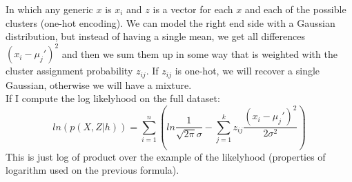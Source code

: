             In which any generic $x$ is $x_i$ and $z$ is a vector for each $x$ and each of the possible clusters (one-hot encoding). We can model the right end side with a Gaussian distribution, but instead of having a single mean, we get all differences $(x_i - \mu_j ') ^2$ and then we sum them up in some way that is weighted with the cluster assignment probability $z_{ij}$. 
            If $z_{ij}$ is one-hot, we will recover a single Gaussian, otherwise we will have a mixture. \\

            If I compute the log likelyhood on the full dataset: 
            $$ln(p(X, Z| h)) = 
            \sum _{i=1} ^n 
            \left(
            ln \frac{1}{\sqrt{2 \pi} \sigma}
                - \sum _{j=1} ^k z_{ij}
                    \frac{(x_i - \mu_j ' )^2}{2 \sigma ^ 2}
            \right)
            $$
            This is just log of product over the example of the likelyhood (properties of logarithm used on the previous formula). \\
            
